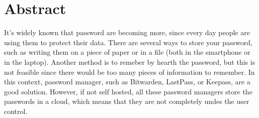 \chapter*{Abstract}

It's widely known that password are becoming more, since every day people are using them to protect their data. There are several ways to store your password, such as writing them on a piece of paper or in a file (both in the smartphone or in the laptop). Another method is to remeber by hearth the password, but this is not feasible since there would be too many pieces of information to remember. In this context, password manager, such as Bitwarden, LastPass, or Keepass, are a good solution. However, if not self hosted, all these password managers store the passwords in a cloud, which means that they are not completely undes the user control. 


